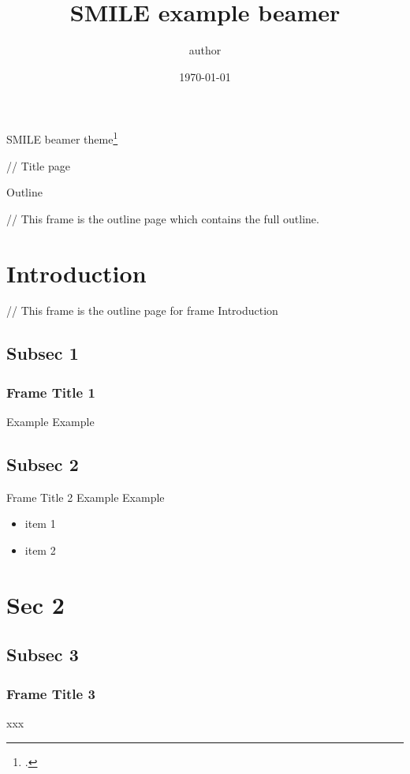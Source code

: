 \documentclass[aspectratio=1610]{beamer}
\title{SMILE example beamer}
\author{author}
\date\today
\begin{document}
\begin{frame}[plain]
  \titlepage

  SMILE beamer theme\footcite{nasy_beamer_2022}

  // Title page
\end{frame}


\begin{frame}{Outline}
  \tableofcontents

  // This frame is the outline page which contains the full outline.
  \end{frame}

\section{Introduction}

\begin{frame}
  \tableofcontents[currentsection, subsectionstyle=show/show/hide]

  // This frame is the outline page for frame Introduction
\end{frame}


\subsection {Subsec 1}
\begin{frame}
  \frametitle{Frame Title 1}
  Example Example
\end{frame}


\subsection {Subsec 2}
\begin{frame}{Frame Title 2}
  Example Example

\begin{itemize}
    \item item 1
    \item item 2
\end{itemize}

\end{frame}


\section {Sec 2}

\begin{frame}
  \tableofcontents[currentsection, subsectionstyle=show/show/hide]
\end{frame}

\subsection {Subsec 3}
\begin{frame}
  \frametitle{Frame Title 3}
xxx
\end{frame}
\end{document}

